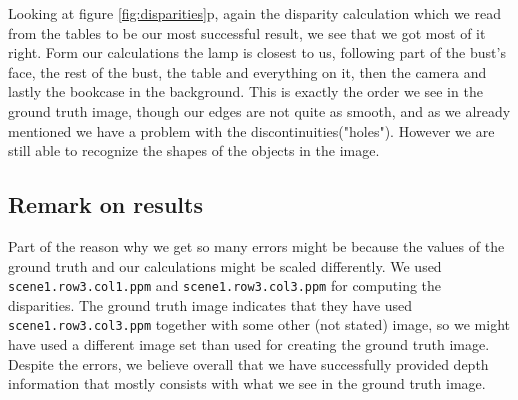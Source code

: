 \documentclass[12pt,a4paper,oneside,final]{article}
\begin{document}
	Looking at figure \ref{fig:disparities}p, again the disparity calculation which we read from the tables to be our most successful result, we see that we got most of it right. Form our calculations the lamp is closest to us, following part of the bust's face, the rest of the bust, the table and everything on it, then the camera and lastly the bookcase in the background. This is exactly the order we see in the ground truth image, though our edges are not quite as smooth, and as we already mentioned we have a problem with the discontinuities("holes"). However we are still able to recognize the shapes of the objects in the image. 
	
	\subsection{Remark on results}
	Part of the reason why we get so many errors might be because the values of the ground truth and our calculations might be scaled differently. We used \texttt{scene1.row3.col1.ppm} and \texttt{scene1.row3.col3.ppm} for computing the disparities. The ground truth image indicates that they have used \texttt{scene1.row3.col3.ppm} together with some other (not stated) image, so we might have used a different image set than used for creating the ground truth image. Despite the errors, we believe overall that we have successfully provided depth information that mostly consists with what we see in the ground truth image.
	
\end{document}
